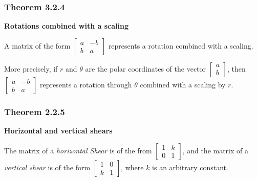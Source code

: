 \documentclass{report}
\begin{document}
\subsubsection*{Theorem 3.2.4}
\par\noindent\textbf{Rotations combined with a scaling}
\par\noindent A matrix of the form $\displaystyle\left[\begin{array}{rr}a&-b\\ b&a\end{array}\right]$ represents a rotation combined with a scaling.
\par\noindent More precisely, if $r$ and $\theta$ are the polar coordinates of the vector $\displaystyle\left[\begin{array}{r}a\\ b\end{array}\right]$, then $\displaystyle\left[\begin{array}{rr}a&-b\\ b&a\end{array}\right]$ represents a rotation through $\theta$ combined with a scaling by $r$.
\subsubsection*{Theorem 2.2.5}
\par\noindent\textbf{Horizontal and vertical shears}
\par\noindent The matrix of a \textit{horizontal Shear} is of the from $\displaystyle\left[\begin{array}{cc}1&k\\ 0&1\end{array}\right]$, and the matrix of a \textit{vertical shear} is of the form $\displaystyle\left[\begin{array}{cc}1&0\\ k&1\end{array}\right]$, where $k$ is an arbitrary constant.\\
\end{document}
